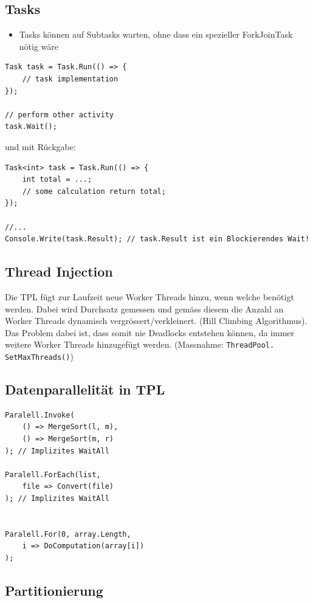 \subsection{Tasks}
\begin{itemize}
	\item Tasks können auf Subtasks warten, ohne dass ein spezieller ForkJoinTask nötig wäre
\end{itemize}

\begin{lstlisting}[language={[Sharp]C}]
Task task = Task.Run(() => {
	// task implementation
});

// perform other activity
task.Wait();
\end{lstlisting}

und mit Rückgabe:
\begin{lstlisting}[language={[Sharp]C}]
Task<int> task = Task.Run(() => { 
	int total = ...;
	// some calculation return total;
});

//...
Console.Write(task.Result); // task.Result ist ein Blockierendes Wait!
\end{lstlisting}

\subsection{Thread Injection}
Die TPL fügt zur Laufzeit neue Worker Threads hinzu, wenn welche benötigt werden. Dabei wird Durchsatz gemessen und gemäss diesem die Anzahl an Worker Threads dynamisch vergrössert/verkleinert. (Hill Climbing Algorithmus). Das Problem dabei ist, dass somit nie Deadlocks entstehen können, da immer weitere Worker Threads hinzugefügt werden. (Massnahme: \lstinline|ThreadPool. SetMaxThreads()|)

\subsection{Datenparallelität in TPL}
\begin{lstlisting}[language={[Sharp]C}]
Paralell.Invoke(
	() => MergeSort(l, m),
	() => MergeSort(m, r)
); // Implizites WaitAll

Paralell.ForEach(list,
	file => Convert(file)
); // Implizites WaitAll


Paralell.For(0, array.Length,
	i => DoComputation(array[i])
);
\end{lstlisting}

\subsection{Partitionierung} 


